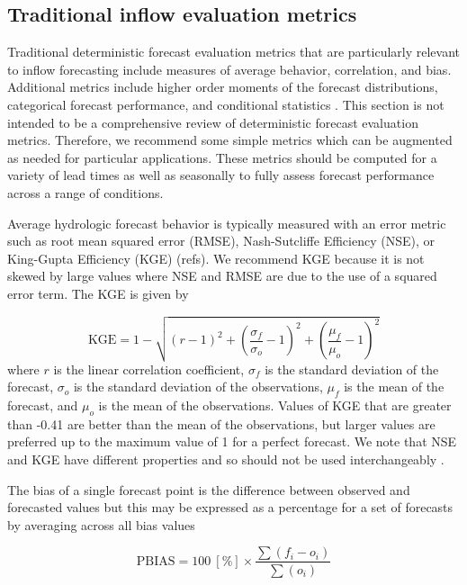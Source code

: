 \documentclass[MLA,Times1COL, hidelinks, doublespace]{WileyNJDv5} %
\begin{document}
\subsection{Traditional inflow evaluation metrics}

Traditional deterministic forecast evaluation metrics that are particularly relevant to inflow forecasting include measures of average behavior, correlation, and bias. Additional metrics include higher order moments of the forecast distributions, categorical forecast performance, and conditional statistics \citep{st-aubinPrecisionReliabilityForecasts2022, hewamalageForecastEvaluationData2023}. This section is not intended to be a comprehensive review of deterministic forecast evaluation metrics. Therefore, we recommend some simple metrics which can be augmented as needed for particular applications. These metrics should be computed for a variety of lead times as well as seasonally to fully assess forecast performance across a range of conditions. 

Average hydrologic forecast behavior is typically measured with an error metric such as root mean squared error (RMSE), Nash-Sutcliffe Efficiency (NSE), or King-Gupta Efficiency (KGE) (refs). We recommend KGE because it is not skewed by large values where NSE and RMSE are due to the use of a squared error term. The KGE is given by

\begin{equation}
    \text{KGE}=1-\sqrt{(r-1)^2+\left(\frac{\sigma_f}{\sigma_o}-1\right)^2+\left(\frac{\mu_f}{\mu_o}-1\right)^2}
\end{equation}
where $r$ is the linear correlation coefficient, $\sigma_f$ is the standard deviation of the forecast, $\sigma_o$ is the standard deviation of the observations, $\mu_f$ is the mean of the forecast, and $\mu_o$ is the mean of the observations. Values of KGE that are greater than -0.41 are better than the mean of the observations, but larger values are preferred up to the maximum value of 1 for a perfect forecast. We note that NSE and KGE have different properties and so should not be used interchangeably \citep{knobenTechnicalNoteInherent2019a}.

The bias of a single forecast point is the difference between observed and forecasted values but this may be expressed as a percentage for a set of forecasts by averaging across all bias values 

\begin{equation}
    \text{PBIAS} = 100\ [\%]\times\frac{\sum(f_i-o_i)}{\sum(o_i)}
\end{equation}
\end{document}
